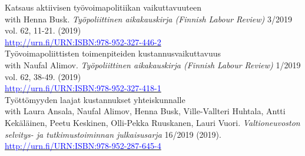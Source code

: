 \documentclass[16pt]{article}
\begin{document}
\noindent Katsaus aktiivisen ty\"{o}voimapolitiikan vaikuttavuuteen \\
\noindent with Henna Busk. \textit{Ty\"{o}poliittinen aikakauskirja (Finnish Labour Review)} 3/2019 vol. 62, 11-21.  (2019) \\
\noindent \href{http://urn.fi/URN:ISBN:978-952-327-446-2}{\textcolor{blue}{http://urn.fi/URN:ISBN:978-952-327-446-2}} \\

\noindent Ty\"{o}voimapoliittisten toimenpiteiden kustannusvaikuttavuus \\
\noindent with Naufal Alimov. \textit{Ty\"{o}poliittinen aikakauskirja (Finnish Labour Review)} 1/2019 vol. 62, 38-49.  (2019) \\
\noindent \href{http://urn.fi/URN:ISBN:978-952-287-645-4}{\textcolor{blue}{http://urn.fi/URN:ISBN:978-952-327-418-1}} \\

\noindent Ty\"{o}tt\"{o}myyden laajat kustannukset yhteiskunnalle \\
\noindent with Laura Ansala, Naufal Alimov, Henna Busk, Ville-Vallteri Huhtala, Antti Kek\"{a}l\"{a}inen, Peetu Keskinen, Olli-Pekka Ruuskanen, Lauri Vuori.  \textit{Valtioneuvoston selvitys- ja tutkimustoiminnan julkaisusarja} 16/2019 (2019). \href{http://urn.fi/URN:ISBN:978-952-287-645-4}{\textcolor{blue}{http://urn.fi/URN:ISBN:978-952-287-645-4}} \\
\end{document}
